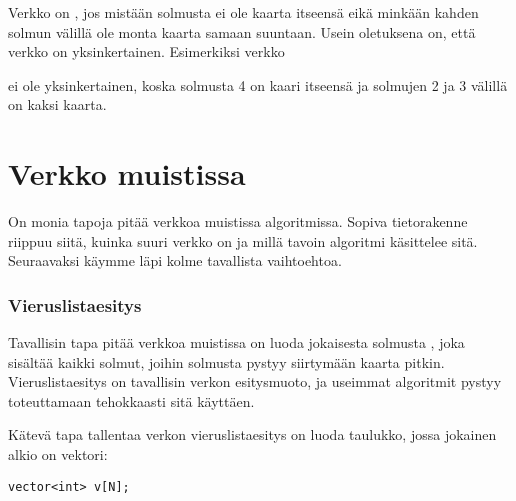 Verkko on ,
jos mistään solmusta ei ole kaarta itseensä
eikä minkään kahden solmun välillä ole
monta kaarta samaan suuntaan.
Usein oletuksena on, että verkko on yksinkertainen.
Esimerkiksi verkko
\begin{center}
\end{center}
ei ole yksinkertainen, koska solmusta 4 on kaari itseensä
ja solmujen 2 ja 3 välillä on kaksi kaarta.

\section{Verkko muistissa}

On monia tapoja pitää verkkoa muistissa algoritmissa.
Sopiva tietorakenne riippuu siitä,
kuinka suuri verkko on ja
millä tavoin algoritmi käsittelee sitä.
Seuraavaksi käymme läpi kolme tavallista vaihtoehtoa.

\subsubsection{Vieruslistaesitys}


Tavallisin tapa pitää verkkoa muistissa on
luoda jokaisesta solmusta ,
joka sisältää kaikki solmut,
joihin solmusta pystyy siirtymään kaarta pitkin.
Vieruslistaesitys on tavallisin verkon esitysmuoto, ja
useimmat algoritmit pystyy toteuttamaan
tehokkaasti sitä käyttäen.

Kätevä tapa tallentaa verkon vieruslistaesitys on luoda taulukko,
jossa jokainen alkio on vektori:
\begin{lstlisting}
vector<int> v[N];
\end{lstlisting}


